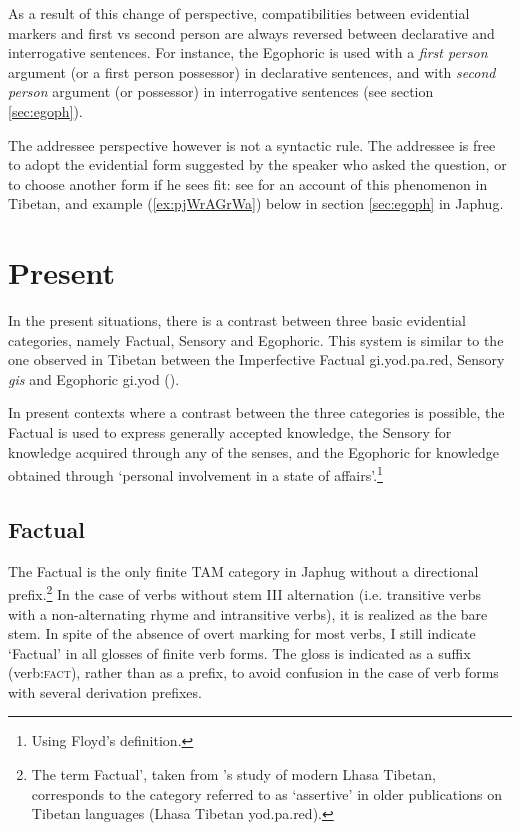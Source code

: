 \documentclass[oldfontcommands,oneside,a4paper,11pt]{article}
\newcommand{\ipa}[1]{{\phon \mbox{#1}}} %
\newcommand{\refb}[1]{(\ref{#1})}
\newcommand{\factual}[1]{\textsc{:fact}}
\begin{document}
As a result of this change of perspective, compatibilities between evidential markers and first vs second person are always reversed between declarative and interrogative sentences. For instance, the Egophoric is used with a \textit{first person} argument (or a first person possessor) in declarative sentences, and with \textit{second person} argument (or possessor) in interrogative sentences (see section \ref{sec:egoph}).

The addressee perspective however is not a syntactic rule. The addressee is free to adopt the evidential form suggested by the speaker who asked the question, or to choose another form if he sees fit: see \citealt{garrett07symbiosis} for an account of this phenomenon in Tibetan, and example
\refb{ex:pjWrAGrWa} below in section \ref{sec:egoph} in Japhug.

\section{Present} \label{sec:evd:prs}
In the present situations, there is a contrast between three basic evidential categories, namely Factual, Sensory and Egophoric. This system is similar to the one observed in Tibetan between the Imperfective Factual \ipa{gi.yod.pa.red}, Sensory \textit{gis} and Egophoric \ipa{gi.yod} (\citealt[295+]{tournadre08conjunct}). 

In present contexts where a contrast between the three categories is possible, the Factual is used to express generally accepted knowledge, the Sensory for knowledge acquired through any of the senses, and the Egophoric for knowledge obtained through `personal involvement in a state of affairs'.\footnote{Using Floyd's \citeyear{floyd16egophoricity} definition.} 


\subsection{Factual} \label{sec:fact}

The Factual is the only finite TAM category in Japhug without a directional prefix.\footnote{The term Factual', taken from \citet{oisel13aux}'s study of modern Lhasa Tibetan, corresponds to the category referred to as `assertive' in older publications on Tibetan languages (Lhasa Tibetan \ipa{yod.pa.red}).} In the case of verbs without stem III alternation (i.e. transitive verbs with a non-alternating rhyme and intransitive verbs), it is realized as the bare stem. In spite of the absence of overt marking for most verbs, I still indicate `Factual' in all glosses of finite verb forms. The gloss is indicated as a suffix (verb\factual{}), rather than as a prefix, to avoid confusion in the case of verb forms with several derivation prefixes.
\end{document}
